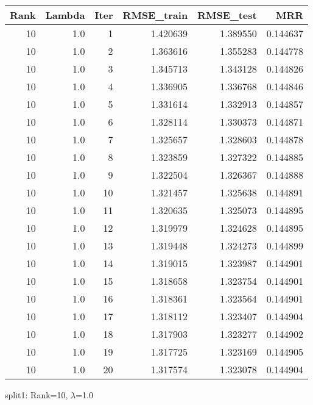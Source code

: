 \begin{tabular}{rrrrrr}
\toprule
 Rank &  Lambda &  Iter &  RMSE\_train &  RMSE\_test &       MRR \\
\midrule
   10 &     1.0 &     1 &    1.420639 &   1.389550 &  0.144637 \\
   10 &     1.0 &     2 &    1.363616 &   1.355283 &  0.144778 \\
   10 &     1.0 &     3 &    1.345713 &   1.343128 &  0.144826 \\
   10 &     1.0 &     4 &    1.336905 &   1.336768 &  0.144846 \\
   10 &     1.0 &     5 &    1.331614 &   1.332913 &  0.144857 \\
   10 &     1.0 &     6 &    1.328114 &   1.330373 &  0.144871 \\
   10 &     1.0 &     7 &    1.325657 &   1.328603 &  0.144878 \\
   10 &     1.0 &     8 &    1.323859 &   1.327322 &  0.144885 \\
   10 &     1.0 &     9 &    1.322504 &   1.326367 &  0.144888 \\
   10 &     1.0 &    10 &    1.321457 &   1.325638 &  0.144891 \\
   10 &     1.0 &    11 &    1.320635 &   1.325073 &  0.144895 \\
   10 &     1.0 &    12 &    1.319979 &   1.324628 &  0.144895 \\
   10 &     1.0 &    13 &    1.319448 &   1.324273 &  0.144899 \\
   10 &     1.0 &    14 &    1.319015 &   1.323987 &  0.144901 \\
   10 &     1.0 &    15 &    1.318658 &   1.323754 &  0.144901 \\
   10 &     1.0 &    16 &    1.318361 &   1.323564 &  0.144901 \\
   10 &     1.0 &    17 &    1.318112 &   1.323407 &  0.144904 \\
   10 &     1.0 &    18 &    1.317903 &   1.323277 &  0.144902 \\
   10 &     1.0 &    19 &    1.317725 &   1.323169 &  0.144905 \\
   10 &     1.0 &    20 &    1.317574 &   1.323078 &  0.144904 \\
\bottomrule
\end{tabular}

\caption{split1: Rank=10, $\lambda$=1.0}
